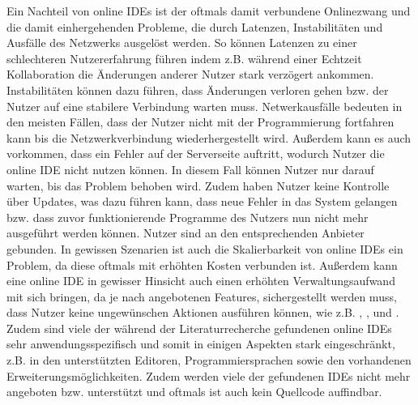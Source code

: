 Ein Nachteil von online IDEs ist der oftmals damit verbundene Onlinezwang und die damit einhergehenden Probleme, die durch Latenzen, Instabilitäten und Ausfälle des Netzwerks ausgelöst werden. So können Latenzen zu einer schlechteren Nutzererfahrung führen indem z.B. während einer Echtzeit Kollaboration die Änderungen anderer Nutzer stark verzögert ankommen. Instabilitäten können dazu führen, dass Änderungen verloren gehen bzw. der Nutzer auf eine stabilere Verbindung warten muss. Netwerkausfälle bedeuten in den meisten Fällen, dass der Nutzer nicht mit der Programmierung fortfahren kann bis die Netzwerkverbindung wiederhergestellt wird. Außerdem kann es auch vorkommen, dass ein Fehler auf der Serverseite auftritt, wodurch Nutzer die online IDE nicht nutzen können. In diesem Fall können Nutzer nur darauf warten, bis das Problem behoben wird. Zudem haben Nutzer keine Kontrolle über Updates, was dazu führen kann, dass neue Fehler in das System gelangen bzw. dass zuvor funktionierende Programme des Nutzers nun nicht mehr ausgeführt werden können. Nutzer sind an den entsprechenden Anbieter gebunden.  In gewissen Szenarien ist auch die Skalierbarkeit von online IDEs ein Problem, da diese oftmals mit erhöhten Kosten verbunden ist. Außerdem kann eine online IDE in gewisser Hinsicht auch einen erhöhten Verwaltungsaufwand mit sich bringen, da je nach angebotenen Features, sichergestellt werden muss, dass Nutzer keine ungewünschen Aktionen ausführen können, wie z.B. , ,  \cite{wu_ceclipse_2011} und  \cite{srinivasa_bad_2022}.  Zudem sind viele der während der Literaturrecherche gefundenen online IDEs sehr anwendungsspezifisch und somit in einigen Aspekten stark eingeschränkt, z.B. in den unterstützten Editoren, Programmiersprachen sowie den vorhandenen Erweiterungsmöglichkeiten.  Zudem werden viele der gefundenen IDEs nicht mehr angeboten bzw. unterstützt und oftmals ist auch kein Quellcode auffindbar.

